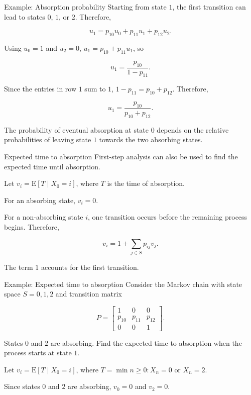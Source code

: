 \documentclass[
  ignorenonframetext,
  aspectratio=169,
]{beamer}
\begin{document}
\begin{frame}{Example: Absorption probability}
\protect{}\label{example-absorption-probability-1}
Starting from state \(1\), the first transition can lead to states
\(0\), \(1\), or \(2\). Therefore,

\[
u_1=p_{10}u_0+p_{11}u_1+p_{12}u_2.
\]

Using \(u_0=1\) and \(u_2=0\), \(u_1=p_{10}+p_{11}u_1\), so

\[
u_1=\frac{p_{10}}{1-p_{11}}.
\]

Since the entries in row \(1\) sum to \(1\), \(1-p_{11}=p_{10}+p_{12}\).
Therefore,

\[
\boxed{u_1=\frac{p_{10}}{p_{10}+p_{12}}}.
\]

The probability of eventual absorption at state \(0\) depends on the
relative probabilities of leaving state \(1\) towards the two absorbing
states.
\end{frame}

\begin{frame}{Expected time to absorption}
\protect{}\label{expected-time-to-absorption-1}
First-step analysis can also be used to find the expected time until
absorption.

Let \(v_i=\mathrm{E}[T\mid X_0=i]\), where \(T\) is the time of
absorption.

For an absorbing state, \(v_i=0\).

For a non-absorbing state \(i\), one transition occurs before the
remaining process begins. Therefore,

\[
v_i=1+\sum_{j\in S}p_{ij}v_j.
\]

The term \(1\) accounts for the first transition.
\end{frame}

\begin{frame}{Example: Expected time to absorption}
\protect{}\label{example-expected-time-to-absorption}
Consider the Markov chain with state space \(S={0,1,2}\) and transition
matrix

\[
P=
\begin{bmatrix}
1&0&0\\
p_{10}&p_{11}&p_{12}\\
0&0&1
\end{bmatrix}.
\]

States \(0\) and \(2\) are absorbing. Find the expected time to
absorption when the process starts at state \(1\).

Let \(v_i=\mathrm{E}[T\mid X_0=i]\), where
\(T=\min{n\geq0:X_n=0\text{ or }X_n=2}\).

Since states \(0\) and \(2\) are absorbing, \(v_0=0\) and \(v_2=0\).
\end{frame}
\end{document}
